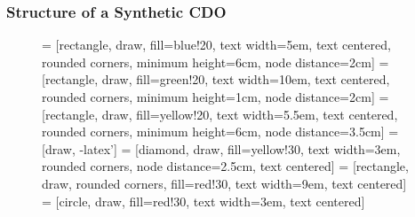 \documentclass[xcolor=dvipsnames]{beamer}
\begin{document}
\begin{frame}
  \frametitle{Structure of a Synthetic CDO}
  \begin{figure}[H]
  \centering
  \label{fig:1}
\usetikzlibrary{shapes.geometric,arrows}
 = [rectangle, draw, fill=blue!20, 
    text width=5em, text centered, rounded corners, minimum height=6cm, node distance=2cm]
 = [rectangle, draw, fill=green!20, 
    text width=10em, text centered, rounded corners, minimum height=1cm, node distance=2cm]
 = [rectangle, draw, fill=yellow!20, 
    text width=5.5em, text centered, rounded corners, minimum height=6cm, node distance=3.5cm]
 = [draw, -latex']
 = [diamond, draw, fill=yellow!30, text width=3em, rounded corners, node distance=2.5cm, text centered]
 = [rectangle, draw, rounded corners, fill=red!30, text width=9em, text centered]
 = [circle, draw, fill=red!30, text width=3em, text centered]

\begin{center}
\end{center}
\end{figure}
\end{frame}
\end{document}
